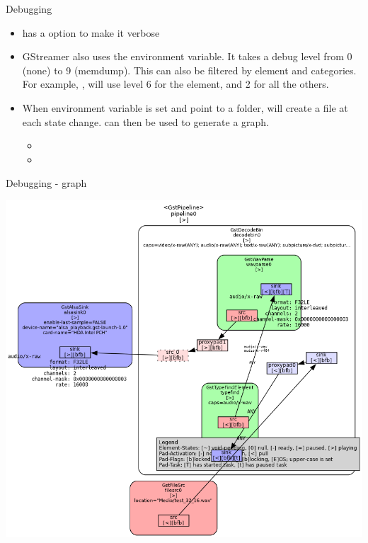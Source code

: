 \begin{frame}{Debugging}
  \begin{itemize}
  \item {} has a  option to make it
    verbose
  \item GStreamer also uses the  environment variable.
    It takes a debug level from 0 (none) to 9 (memdump). This can also
    be filtered by element and categories. For example,
    , will use level 6 for the
     element, and 2 for all the others.
  \item When  environment variable is set
    and point to a folder,  will create a
     file at each state change.  can then be
    used to generate a graph.
    \begin{itemize}
    \item {}
    \item {}
    \end{itemize}
  \end{itemize}
\end{frame}

\begin{frame}{Debugging - graph}
  \begin{center}
    \includegraphics[height=0.8\textheight]{slides/audio-gstreamer/pipeline.png}\\
  \end{center}
\end{frame}


